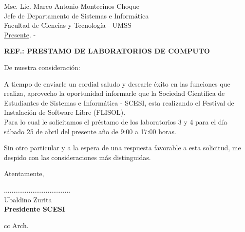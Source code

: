 \documentclass[letterpaper,12pt]{letter}
\begin{document}
\date{12 de marzo de 2015}
\begin{letter}{Msc. Lic. Marco Antonio Montecinos Choque \\ Jefe de Departamento de Sistemas e Informática \\ Facultad de Ciencias y Tecnolog\'ia - UMSS \\ \underline {Presente}. -}


\begin{center}
	\opening{\textbf{REF.: PRESTAMO DE LABORATORIOS DE COMPUTO}}
\end{center}

De nuestra consideración:

A tiempo de enviarle un cordial saludo y desearle éxito en las funciones que realiza, aprovecho la oportunidad informarle que la Sociedad Cient\'ifica de Estudiantes de Sistemas e Inform\'atica - SCESI, esta realizando el Festival de Instalación de Software Libre (FLISOL).\\

Para lo cual le solicitamos el préstamo de los laboratorios 3 y 4 para el día sábado 25 de abril del presente año de 9:00 a 17:00 horas.

Sin otro particular y a la espera de una respuesta favorable a esta solicitud, me despido con las 
consideraciones más distinguidas.

Atentamente,

\vspace{2.5cm}

\begin{center}
...................................\\
Ubaldino Zurita\\
{\bfseries Presidente SCESI}
\end{center}
\vspace{1cm}
cc Arch.
\end{letter}
\end{document}
